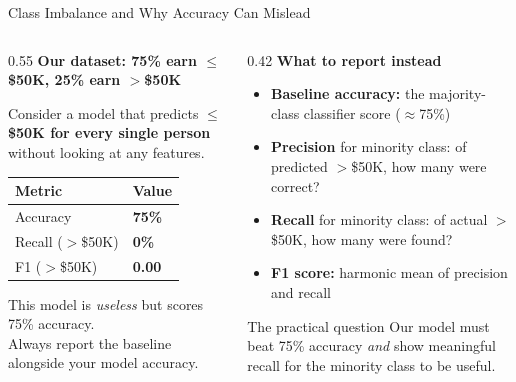 \documentclass[aspectratio=169, 10pt]{beamer}
\begin{document}
\begin{frame}{Class Imbalance and Why Accuracy Can Mislead}

\begin{columns}[T]
\begin{column}{0.55\textwidth}
\textbf{Our dataset: 75\% earn $\leq$\$50K, 25\% earn $>$\$50K}

\vspace{0.5em}
Consider a model that predicts \textbf{$\leq$\$50K for every single person} without looking at any features.

\begin{center}
\small
\renewcommand{\arraystretch}{1.2}
\begin{tabular}{ll}
\toprule
Metric & Value \\
\midrule
Accuracy & \textbf{75\%} \\
Recall ($>$\$50K) & \textbf{0\%} \\
F1 ($>$\$50K) & \textbf{0.00} \\
\bottomrule
\end{tabular}
\end{center}

\vspace{0.4em}
This model is \textit{useless} but scores 75\% accuracy.\\
\alert{Always report the baseline alongside your model accuracy.}
\end{column}
\begin{column}{0.42\textwidth}
\textbf{What to report instead}
\begin{itemize}
  \setlength\itemsep{0.35em}
  \item \textbf{Baseline accuracy:} the majority-class classifier score ($\approx$75\%)
  \item \textbf{Precision} for minority class: of predicted $>$\$50K, how many were correct?
  \item \textbf{Recall} for minority class: of actual $>$\$50K, how many were found?
  \item \textbf{F1 score:} harmonic mean of precision and recall
\end{itemize}
\vspace{0.5em}
\begin{alertblock}{The practical question}
Our model must beat 75\% accuracy \textit{and} show meaningful recall for the minority class to be useful.
\end{alertblock}
\end{column}
\end{columns}
\end{frame}
\end{document}
